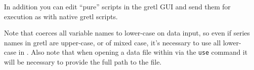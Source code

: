In addition you can edit ``pure''  scripts in the gretl GUI
and send them for execution as with native gretl scripts.

Note that  coerces all variable names to lower-case on data
input, so even if series names in gretl are upper-case, or of mixed
case, it's necessary to use all lower-case in . Also note
that when opening a data file within  via the \texttt{use}
command it will be necessary to provide the full path to the file.


